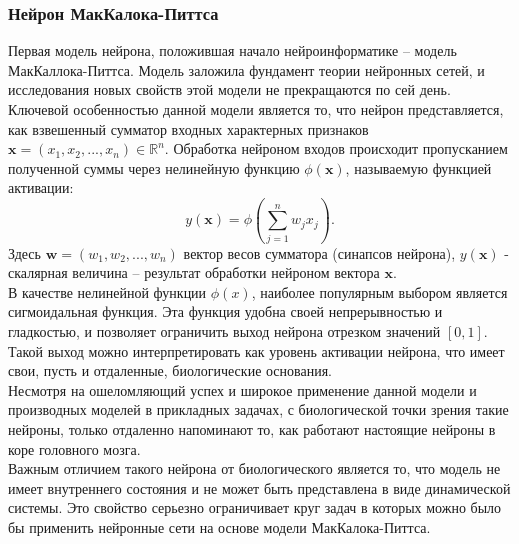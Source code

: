 \documentclass[a4paper,10pt]{article}
\begin{document}
\subsubsection{Нейрон МакКалока-Питтса}
   Первая модель нейрона, положившая начало нейроинформатике -- модель МакКаллока-Питтса. Модель заложила фундамент теории нейронных сетей, и исследования новых свойств этой модели не прекращаются по сей день.\\
   \indent Ключевой особенностью данной модели является то, что нейрон представляется, как взвешенный сумматор входных характерных признаков $\boldsymbol{x}=(x_{1},x_{2},...,x_{n}) \in \mathbb{R}^n$. Обработка нейроном входов происходит пропусканием полученной суммы через нелинейную функцию $\phi(\boldsymbol{x})$, называемую функцией активации:\\
   \begin{equation}\label{eq:sum_mp}
   y(\boldsymbol{x}) = \phi(\sum_{j=1}^{n}w_{j}x_{j}).
   \end{equation}
\indent Здесь $\boldsymbol{w}=(w_{1}, w_{2},...,w_{n})$ вектор весов сумматора (синапсов нейрона), $y(\boldsymbol{x})$ - скалярная величина -- результат обработки нейроном вектора $\boldsymbol{x}$.\\	
	\indent В качестве нелинейной функции $\phi(x)$, наиболее популярным выбором является сигмоидальная функция\cite{Zaencev1999}. Эта функция удобна своей непрерывностью и гладкостью, и позволяет ограничить выход нейрона  отрезком значений $[0,1]$. Такой выход можно интерпретировать как уровень активации нейрона, что имеет свои, пусть и отдаленные, биологические основания. \\
   \indent Несмотря на ошеломляющий успех и широкое применение данной модели  и производных моделей в прикладных задачах, с биологической точки зрения такие нейроны, только отдаленно напоминают то, как работают настоящие нейроны в коре головного мозга.\\
   \indent Важным отличием такого нейрона от биологического является то, что модель не имеет внутреннего состояния и не может быть представлена в виде динамической системы\cite{Zaencev1999}. Это свойство серьезно ограничивает круг задач в которых можно было бы применить нейронные сети на основе модели МакКалока-Питтса. 
\end{document}
